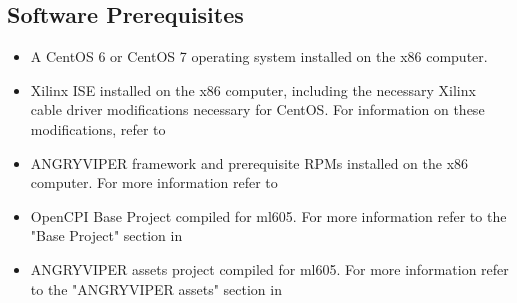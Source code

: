 \documentclass{article}
\begin{document}
\subsection*{Software Prerequisites}
\begin{itemize}
\item A CentOS 6 or CentOS 7 operating system installed on the x86 computer.
\item Xilinx ISE installed on the x86 computer, including the necessary Xilinx cable driver modifications necessary for CentOS. For information on these modifications, refer to \cite{angryviper_fpga_vendor_tool_guide}
\item ANGRYVIPER framework and prerequisite RPMs installed on the x86 computer. For more information refer to \cite{angryviper_installation_guide}
\item OpenCPI Base Project compiled for ml605. For more information refer to the "Base Project" section in \cite{angryviper_installation_guide}
\item ANGRYVIPER assets project compiled for ml605. For more information refer to the "ANGRYVIPER assets" section in \cite{angryviper_installation_guide}
\end{itemize}
\end{document}
